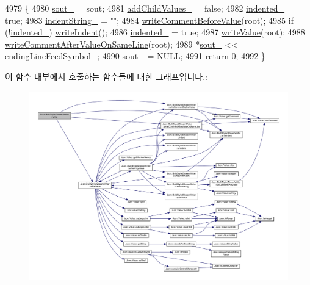 \begin{DoxyCode}
4979 \{
4980   \hyperlink{class_json_1_1_stream_writer_a4f5603d4228a9fa46a42cb44e5234d9b}{sout\_} = sout;
4981   \hyperlink{struct_json_1_1_built_styled_stream_writer_abed9cc31da503b48798e7cea68c42e16}{addChildValues\_} = \textcolor{keyword}{false};
4982   \hyperlink{struct_json_1_1_built_styled_stream_writer_a6aa0ad023e623f600103631a6bca6d10}{indented\_} = \textcolor{keyword}{true};
4983   \hyperlink{struct_json_1_1_built_styled_stream_writer_a0f8115a4fb474ab0e9de25f10e5ca09a}{indentString\_} = \textcolor{stringliteral}{""};
4984   \hyperlink{struct_json_1_1_built_styled_stream_writer_a32c4afca4e08fba79bb0a80a8010283a}{writeCommentBeforeValue}(root);
4985   \textcolor{keywordflow}{if} (!\hyperlink{struct_json_1_1_built_styled_stream_writer_a6aa0ad023e623f600103631a6bca6d10}{indented\_}) \hyperlink{struct_json_1_1_built_styled_stream_writer_a2b38a3714d415c4bd3b4812897130f3d}{writeIndent}();
4986   \hyperlink{struct_json_1_1_built_styled_stream_writer_a6aa0ad023e623f600103631a6bca6d10}{indented\_} = \textcolor{keyword}{true};
4987   \hyperlink{struct_json_1_1_built_styled_stream_writer_a7c9da861861e570a51b45f270c9ff150}{writeValue}(root);
4988   \hyperlink{struct_json_1_1_built_styled_stream_writer_a89625b134fce0255263ca40e6125742b}{writeCommentAfterValueOnSameLine}(root);
4989   *\hyperlink{class_json_1_1_stream_writer_a4f5603d4228a9fa46a42cb44e5234d9b}{sout\_} << \hyperlink{struct_json_1_1_built_styled_stream_writer_a5e61a9a4b2af52b98900286c843b86f7}{endingLineFeedSymbol\_};
4990   \hyperlink{class_json_1_1_stream_writer_a4f5603d4228a9fa46a42cb44e5234d9b}{sout\_} = NULL;
4991   \textcolor{keywordflow}{return} 0;
4992 \}
\end{DoxyCode}
이 함수 내부에서 호출하는 함수들에 대한 그래프입니다.\+:
\nopagebreak
\begin{figure}[H]
\begin{center}
\leavevmode
\includegraphics[width=350pt]{struct_json_1_1_built_styled_stream_writer_a823cdb1afabb6b0d5f39bcd5a6a6f747_cgraph}
\end{center}
\end{figure}
